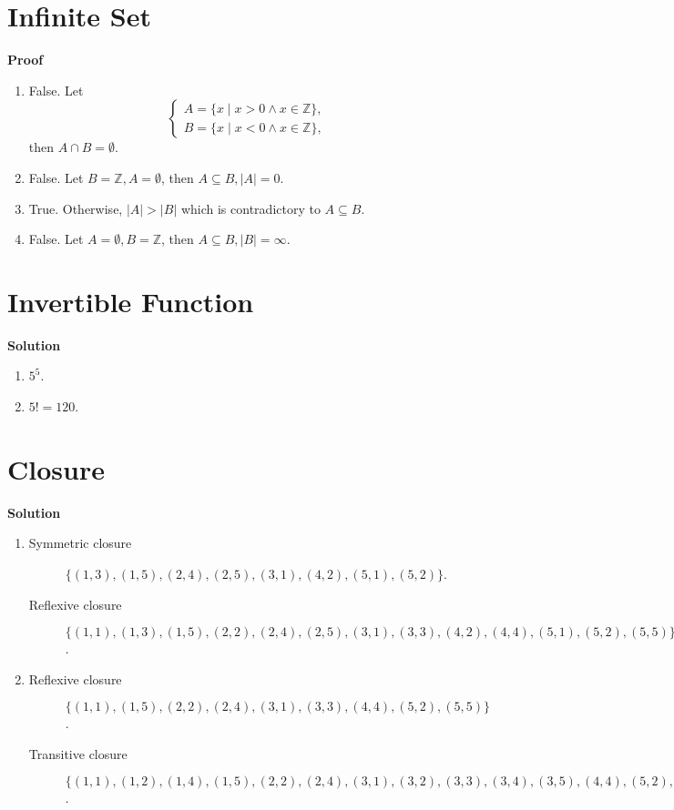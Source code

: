 \documentclass{../../cls/sig-alternate-05-2015}
\begin{document}
\section{Infinite Set}
\textbf{Proof}\begin{enumerate}[label=(\alph*)]
	\item False. Let \begin{equation}
		\begin{cases}
		A = \{x \mid x > 0 \land x \in \mathbb{Z}\},\\
		B = \{x \mid x < 0 \land x \in \mathbb{Z}\},
		\end{cases}
	\end{equation} then $A \cap B = \emptyset$.
	\item False. Let $B = \mathbb{Z}, A = \emptyset$, then $A \subseteq B, \left|A\right| = 0$.
	\item True. Otherwise, $\left|A\right| > \left|B\right|$ which is contradictory to $A \subseteq B$.
	\item False. Let $A = \emptyset, B = \mathbb{Z}$, then $A \subseteq B, \left|B\right| = \infty$.
\end{enumerate}

\section{Invertible Function}
\textbf{Solution}\begin{enumerate}[label=(\alph*)]
	\item $5^5$.
	\item $5! = 120$.
\end{enumerate}

\section{Closure}
\textbf{Solution}\begin{enumerate}[label=(\alph*)]
	\item \begin{description}
		\item[Symmetric closure] $\{(1, 3), (1, 5), (2, 4), (2, 5), (3, 1), (4, 2), (5, 1), (5, 2)\}$.
		\item[Reflexive closure] $\{(1, 1), (1, 3), (1, 5), (2, 2), (2, 4), (2, 5), (3, 1), (3, 3), (4, 2), (4, 4), (5, 1), (5, 2), (5, 5)\}$.
	\end{description}
	\item \begin{description}
		\item[Reflexive closure] $\{(1, 1), (1, 5), (2, 2), (2, 4), (3, 1), (3, 3), (4, 4), (5, 2), (5, 5)\}$.
		\item[Transitive closure] $\{(1, 1), (1, 2), (1, 4), (1, 5), (2, 2), (2, 4), (3, 1), (3, 2), (3, 3), (3, 4), (3, 5), (4, 4), (5, 2), (5, 4), (5, 5)\}$.
	\end{description}
\end{enumerate}
\end{document}
